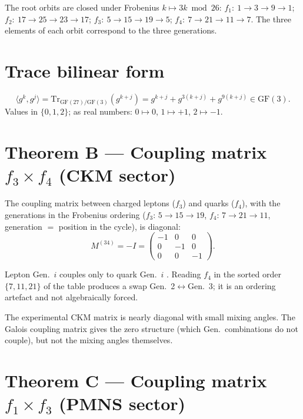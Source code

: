 \begin{theorem}
The root orbits are closed under Frobenius $k\mapsto3k\bmod26$:
$f_1:\ 1\to3\to9\to1$; $f_2:\ 17\to25\to23\to17$;
$f_3:\ 5\to15\to19\to5$; $f_4:\ 7\to21\to11\to7$.
The three elements of each orbit correspond to the three generations.
\end{theorem}

\section{Trace bilinear form}

\[
  \langle g^k, g^j\rangle = \mathrm{Tr}_{\mathrm{GF}(27)/\mathrm{GF}(3)}(g^{k+j})
  = g^{k+j}+g^{3(k+j)}+g^{9(k+j)}\in\mathrm{GF}(3).
\]
Values in $\{0,1,2\}$; as real numbers: $0\mapsto0$, $1\mapsto+1$, $2\mapsto-1$.

\section{Theorem B --- Coupling matrix $f_3\times f_4$ (CKM sector)}

\begin{theorem}
The coupling matrix between charged leptons ($f_3$) and quarks ($f_4$), with the
generations in the Frobenius ordering ($f_3$: $5\to15\to19$, $f_4$: $7\to21\to11$,
generation $=$ position in the cycle), is diagonal:
\[
  M^{(34)} = -I = \begin{pmatrix}-1&0&0\\0&-1&0\\0&0&-1\end{pmatrix}.
\]
\end{theorem}

Lepton Gen.~$i$ couples only to quark Gen.~$i$ \BM. Reading $f_4$ in the sorted
order $\{7,11,21\}$ of the table produces a swap Gen.~2$\leftrightarrow$Gen.~3;
it is an ordering artefact and not algebraically forced.

The experimental CKM matrix is nearly diagonal with small mixing angles. The
Galois coupling matrix gives the zero structure (which Gen.\ combinations do
not couple), but not the mixing angles themselves. \SM

\section{Theorem C --- Coupling matrix $f_1\times f_3$ (PMNS sector)}

